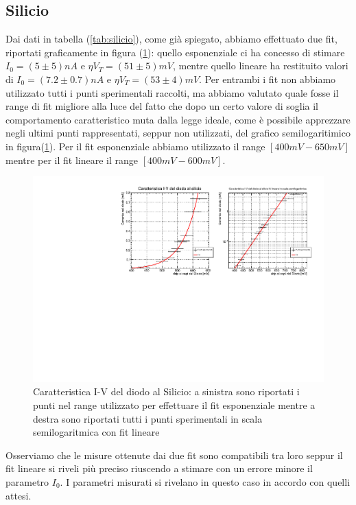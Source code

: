 \documentclass[]{article}
\begin{document}
\subsection{Silicio}
Dai dati in tabella (\ref{tab:silicio}), come già spiegato, abbiamo effettuato due fit, riportati graficamente in figura (\ref{fig:silicio}): quello esponenziale ci ha concesso di stimare $I_0=(5\pm5)nA$ e $\eta V_T=(51\pm5)mV$, mentre quello lineare ha restituito valori di $I_0=(7.2\pm0.7)nA$ e $\eta V_T=(53\pm4)mV$. Per entrambi i fit non abbiamo utilizzato tutti i punti sperimentali raccolti, ma abbiamo valutato quale fosse il range di fit migliore alla luce del fatto che dopo un certo valore di soglia il comportamento caratteristico muta dalla legge ideale, come è possibile apprezzare negli ultimi punti rappresentati, seppur non utilizzati, del grafico semilogaritimico in figura(\ref{fig:silicio}). 
Per il fit esponenziale abbiamo utilizzato il range $[400mV-650mV]$ mentre per il fit lineare il range $[400mV-600mV]$.
\begin{figure}[H]
	\centering
	\includegraphics[width=0.8\linewidth]{../Silicio/canvas}
	\caption{Caratteristica I-V del diodo al Silicio: a sinistra sono riportati i punti nel range utilizzato per effettuare il fit esponenziale mentre a destra sono riportati tutti i punti sperimentali in scala semilogaritmica con fit lineare}
	\label{fig:silicio}
\end{figure}
Osserviamo che le misure ottenute dai due fit sono compatibili tra loro seppur il fit lineare si riveli più preciso riuscendo a stimare con un errore minore il parametro $I_0$.
I parametri misurati si rivelano in questo caso in accordo con quelli attesi.
\end{document}
